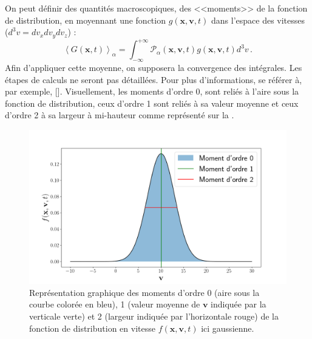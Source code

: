 On peut définir des quantités macroscopiques, des <<moments>> de la fonction de distribution, en moyennant une fonction $g\left(\mathbf{x},\mathbf{v},t\right)$ dans l'espace des vitesses ($d^3v=dv_xdv_ydv_z$) : 
\begin{equation}
 \left<G\left(\mathbf{x},t\right)\right>_{\alpha} = \int^{+\infty}_{-\infty} \mathcal{P}_{\alpha}\left(\mathbf{x},\mathbf{v},t\right) g\left(\mathbf{x},\mathbf{v},t\right) d^3v \, .
\end{equation}
Afin d'appliquer cette moyenne, on supposera la convergence des intégrales. Les étapes de calculs ne seront pas détaillées. Pour plus d'informations, se référer à, par exemple, [\cite{krall_principles_1973,rax_physique_2005,galtier_introduction_2016,belmont_introduction_2018}].
Visuellement, les moments d'ordre 0, sont reliés à l'aire sous la fonction de distribution, ceux d'ordre 1 sont reliés à sa valeur moyenne et ceux d'ordre 2 à sa largeur à mi-hauteur comme représenté sur la . 
\begin{figure}[!ht]
 \centering
\includegraphics[width=\linewidth,trim=2cm 0cm 3cm 1cm, clip=true]{./Part_0/images/distrib}
\cprotect\caption{Représentation graphique des moments d'ordre 0 (aire sous la courbe colorée en bleu), 1 (valeur moyenne de $\mathbf{v}$ indiquée par la verticale verte) et 2 (largeur indiquée par l'horizontale rouge) de la fonction de distribution en vitesse $f\left(\mathbf{x},\mathbf{v},t\right)$ ici gaussienne.}
\label{fig:distrib}
\end{figure}
 

